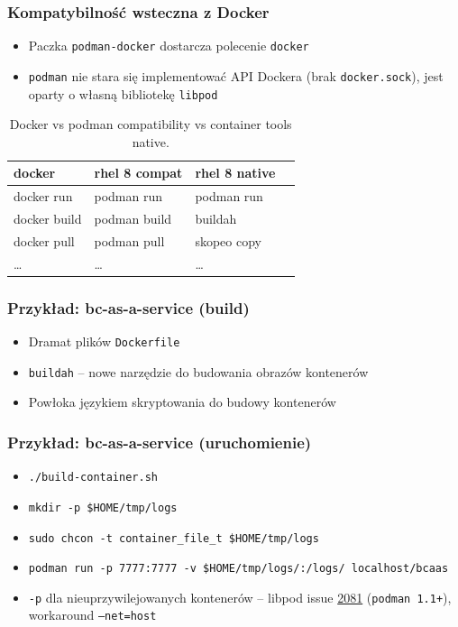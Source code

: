 \documentclass[dvipsnames,table]{beamer}
\begin{document}
\begin{frame}
	\frametitle{Kompatybilność wsteczna z Docker}
	\begin{itemize}
		\item Paczka {\tt podman-docker} dostarcza polecenie {\tt docker}
		\item {\tt podman} nie stara się implementować API Dockera (brak {\tt docker.sock}), jest oparty o własną bibliotekę {\tt libpod}
	\end{itemize}
\centering
	\begin{table}
\caption{Docker vs podman compatibility vs container tools native.}
\label{porownanie}
\scriptsize
\begin{tabular}{llll}
\hline
docker & rhel 8 compat & rhel 8 native   \\ \hline
	docker run & podman run & podman run \\
	docker build & podman build & buildah  \\
	docker pull & podman pull & skopeo copy \\ 
	\ldots & \ldots & \ldots \\ \hline
\end{tabular}
\normalsize
\end{table}
\end{frame}

\begin{frame}[fragile]
	\frametitle{Przykład: bc-as-a-service (build)}
\begin{itemize}
	\item Dramat plików {\tt Dockerfile}
	\item {\tt buildah} -- nowe narzędzie do budowania obrazów kontenerów
	\item Powłoka językiem skryptowania do budowy kontenerów
\end{itemize}

\end{frame}

\begin{frame}
	\frametitle{Przykład: bc-as-a-service (uruchomienie)}
	\begin{itemize}
		\item {\tt ./build-container.sh}
		\item {\tt mkdir -p \$HOME/tmp/logs}
		\item {\tt sudo chcon -t container\_file\_t \$HOME/tmp/logs}
		\item {\tt podman run -p 7777:7777 -v \$HOME/tmp/logs/:/logs/ localhost/bcaas}
		\item {\tt -p} dla nieuprzywilejowanych kontenerów -- libpod issue \href{https://github.com/containers/libpod/issues/2081}{2081} ({\tt podman 1.1+}), workaround {\tt --net=host}
	\end{itemize}
\end{frame}
\end{document}
